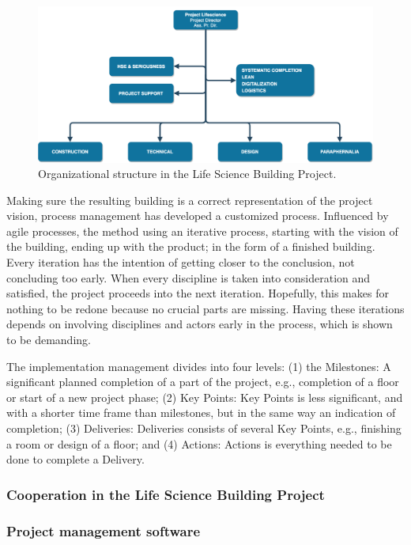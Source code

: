 \begin{figure}
    \centering
    \includegraphics[width=\textwidth]{fig/lvb_diagram.png}
    \caption{Organizational structure in the Life Science Building Project.}
    \label{fig:project_structure}
\end{figure}




Making sure the resulting building is a correct representation of the project vision, process management has developed a customized process. Influenced by agile processes, the method using an iterative process, starting with the vision of the building, ending up with the product; in the form of a finished building. Every iteration has the intention of getting closer to the conclusion, not concluding too early. When every discipline is taken into consideration and satisfied, the project proceeds into the next iteration. Hopefully, this makes for nothing to be redone because no crucial parts are missing. Having these iterations depends on involving disciplines and actors early in the process, which is shown to be demanding.

The implementation management divides into four levels: (1) the Milestones: A significant planned completion of a part of the project, e.g., completion of a floor or start of a new project phase; (2) Key Points: Key Points is less significant, and with a shorter time frame than milestones, but in the same way an indication of completion; (3) Deliveries: Deliveries consists of several Key Points, e.g., finishing a room or design of a floor; and (4) Actions: Actions is everything needed to be done to complete a Delivery. 

\subsubsection{Cooperation in the Life Science Building Project}


\subsubsection{Project management software}

